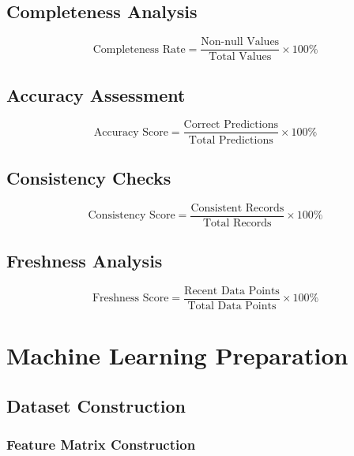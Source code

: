 \documentclass[12pt,a4paper]{article}
\begin{document}
\subsection{Completeness Analysis}

\begin{equation}
\text{Completeness Rate} = \frac{\text{Non-null Values}}{\text{Total Values}} \times 100\%
\end{equation}

\subsection{Accuracy Assessment}

\begin{equation}
\text{Accuracy Score} = \frac{\text{Correct Predictions}}{\text{Total Predictions}} \times 100\%
\end{equation}

\subsection{Consistency Checks}

\begin{equation}
\text{Consistency Score} = \frac{\text{Consistent Records}}{\text{Total Records}} \times 100\%
\end{equation}

\subsection{Freshness Analysis}

\begin{equation}
\text{Freshness Score} = \frac{\text{Recent Data Points}}{\text{Total Data Points}} \times 100\%
\end{equation}

\section{Machine Learning Preparation}

\subsection{Dataset Construction}

\subsubsection{Feature Matrix Construction}
\end{document}
